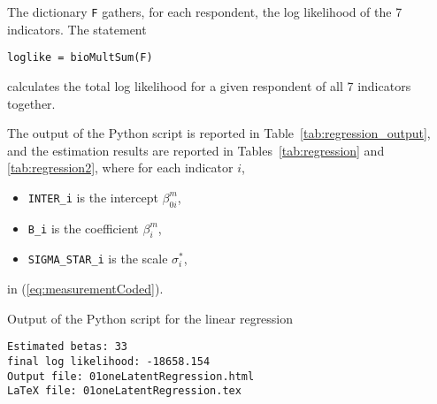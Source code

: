 \documentclass[12pt,a4paper]{article}
\newcommand{\req}[1]{(\ref{#1})}
\begin{document}
The dictionary \lstinline$F$ gathers, for each respondent, the log
likelihood of the 7 indicators. The statement 
\begin{lstlisting}
loglike = bioMultSum(F)
\end{lstlisting}
calculates the total log likelihood for a given respondent of all 7
indicators together. 

The output of the Python script is reported in Table~\ref{tab:regression_output}, and the estimation results are reported in Tables~\ref{tab:regression} and
\ref{tab:regression2}, where for each indicator $i$,
\begin{itemize}
\item \lstinline$INTER_i$ is the intercept $\beta_{0i}^m$,
\item \lstinline$B_i$ is the coefficient $\beta^m_i$,
\item \lstinline$SIGMA_STAR_i$ is the scale $\sigma_i^*$,
\end{itemize}
in \req{eq:measurementCoded}.

\begin{table}[htb]
\caption{\label{tab:regression_output}Output of the Python script for the linear regression}
  \begin{lstlisting}
Estimated betas: 33
final log likelihood: -18658.154
Output file: 01oneLatentRegression.html
LaTeX file: 01oneLatentRegression.tex
  \end{lstlisting}
\end{table}
\end{document}
